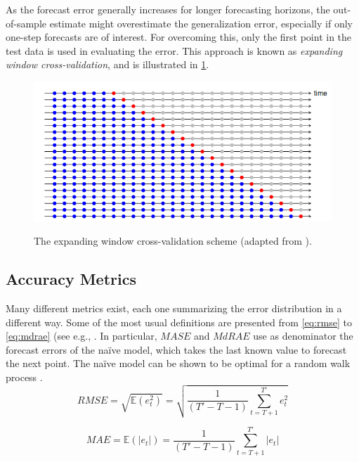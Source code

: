 As the forecast error generally increases for longer forecasting horizons, the out-of-sample estimate might overestimate the generalization error, especially if only one-step forecasts are of interest. For overcoming this, only the  first point in the test data is used in evaluating the error. This approach is known as \textit{expanding window cross-validation}, and is illustrated in \ref{fig:expanding_window_cv}.
\begin{figure}[H]%
	\centering
    \caption{The expanding window cross-validation scheme (adapted from \cite{krispin2019handson}).}
    \includegraphics[scale=0.8]{expanding_window_cv.png}
	\label{fig:expanding_window_cv}
\end{figure}


\subsection{Accuracy Metrics}\label{subsec:metrics}
Many different metrics exist, each one summarizing the error distribution in a different way. Some of the most usual definitions  are presented from \ref{eq:rmse} to \ref{eq:mdrae} (see e.g., \cite{wu2019graphwavenet, liu2019st-mgcn, hyndman2006metrics}. In particular, $MASE$ and $MdRAE$ use as denominator the forecast errors of the naïve model, which takes the last known value to forecast the next point. The naïve model can be shown to be optimal for a random walk process \cite{hyndman2006metrics}.
\begin{equation}\label{eq:rmse}
    RMSE = \sqrt{\mathbb{E}(e_t^2)} = \sqrt{\frac{1}{(T'-T-1)}\sum_{t=T+1}^{T'} e^2_t}
\end{equation}

\begin{equation}\label{eq:mae}
    MAE = \mathbb{E}(|e_t|) = \frac{1}{(T'-T-1)}\sum_{t=T+1}^{T'} |e_t|
\end{equation}


